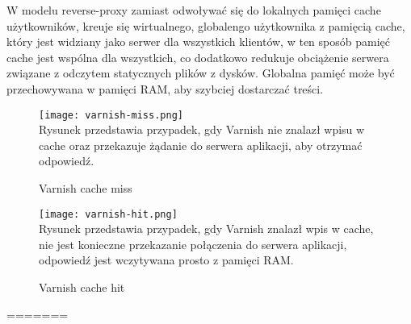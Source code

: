 W modelu reverse-proxy zamiast odwoływać się do lokalnych pamięci cache użytkowników, kreuje się wirtualnego, globalengo użytkownika z pamięcią cache, który jest widziany jako serwer dla wszystkich klientów, w ten sposób pamięć cache jest wspólna dla wszystkich, co dodatkowo redukuje obciążenie serwera związane z odczytem statycznych plików z dysków. Globalna pamięć może być przechowywana w pamięci RAM, aby szybciej dostarczać treści.

\begin{figure}[H]
  \caption[Varnish cache miss]{Varnish cache miss}
  \centering
    \texttt{[image: varnish-miss.png]} \\
    Rysunek przedstawia przypadek, gdy Varnish nie znalazł wpisu w cache oraz przekazuje żądanie do serwera aplikacji, aby otrzymać odpowiedź.
\end{figure}

\begin{figure}[H]
  \caption[Varnish cache hit]{Varnish cache hit}
  \centering
    \texttt{[image: varnish-hit.png]} \\
    Rysunek przedstawia przypadek, gdy Varnish znalazł wpis w cache, nie jest konieczne przekazanie połączenia do serwera aplikacji, odpowiedź jest wczytywana prosto z pamięci RAM.
\end{figure}
=======
